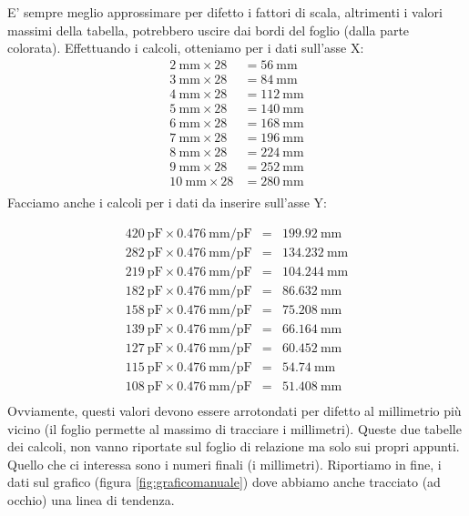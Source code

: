 E' sempre meglio approssimare per difetto i fattori di scala, altrimenti i valori massimi della tabella, potrebbero uscire dai bordi del foglio (dalla parte colorata).
Effettuando i calcoli, otteniamo per i dati sull'asse X:
\begin{equation*}
\begin{aligned}
\SI{2}{\milli\meter} \times 28 &= \SI{56}{\milli\meter}  \\
\SI{3}{\milli\meter}  \times 28 &= \SI{84}{\milli\meter}  \\
\SI{4}{\milli\meter}  \times 28 &= \SI{112}{\milli\meter}   \\
\SI{5}{\milli\meter}  \times 28 &= \SI{140}{\milli\meter}  \\
\SI{6}{\milli\meter}  \times 28 &= \SI{168}{\milli\meter}   \\
\SI{7}{\milli\meter}  \times 28 &= \SI{196}{\milli\meter}  \\
\SI{8}{\milli\meter}  \times 28 &= \SI{224}{\milli\meter}  \\
\SI{9}{\milli\meter}  \times 28 &= \SI{252}{\milli\meter}  \\
\SI{10}{\milli\meter}  \times 28 &= \SI{280}{\milli\meter}  \\
\end{aligned}
\end{equation*}
Facciamo anche i calcoli per i dati da inserire sull'asse Y:

\[
\begin{array}{rcl}
\SI{420}{\pico\farad} \times \SI{0.476}{\milli\meter\per\pico\farad} &=& \SI{199.92}{\milli\meter} \\
\SI{282}{\pico\farad} \times \SI{0.476}{\milli\meter\per\pico\farad} &=& \SI{134.232}{\milli\meter} \\
\SI{219}{\pico\farad} \times \SI{0.476}{\milli\meter\per\pico\farad} &=& \SI{104.244}{\milli\meter} \\
\SI{182}{\pico\farad} \times \SI{0.476}{\milli\meter\per\pico\farad} &=& \SI{86.632}{\milli\meter} \\
\SI{158}{\pico\farad} \times \SI{0.476}{\milli\meter\per\pico\farad} &=& \SI{75.208}{\milli\meter} \\
\SI{139}{\pico\farad} \times \SI{0.476}{\milli\meter\per\pico\farad} &=& \SI{66.164}{\milli\meter} \\
\SI{127}{\pico\farad} \times \SI{0.476}{\milli\meter\per\pico\farad} &=& \SI{60.452}{\milli\meter} \\
\SI{115}{\pico\farad} \times \SI{0.476}{\milli\meter\per\pico\farad} &=& \SI{54.74}{\milli\meter} \\
\SI{108}{\pico\farad} \times \SI{0.476}{\milli\meter\per\pico\farad} &=& \SI{51.408}{\milli\meter} \\
\end{array}
\]
Ovviamente, questi valori devono essere arrotondati per difetto al millimetrio più vicino (il foglio permette al massimo di tracciare i millimetri). Queste due tabelle dei calcoli, non vanno riportate sul foglio di relazione ma solo sui propri appunti. Quello che ci interessa sono i numeri finali (i millimetri). Riportiamo in fine, i dati sul grafico (figura \ref{fig:graficomanuale}) dove abbiamo anche tracciato (ad occhio) una linea di tendenza. 
 
